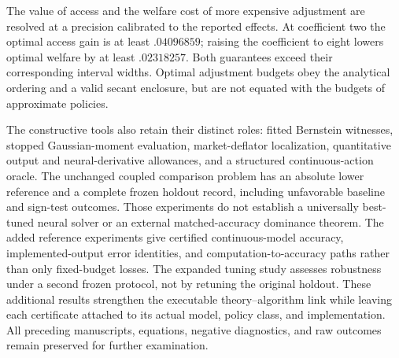 The value of access and the welfare cost of more expensive adjustment are resolved at a precision calibrated to the reported effects. At coefficient two the optimal access gain is at least $.04096859$; raising the coefficient to eight lowers optimal welfare by at least $.02318257$. Both guarantees exceed their corresponding interval widths. Optimal adjustment budgets obey the analytical ordering and a valid secant enclosure, but are not equated with the budgets of approximate policies.

The constructive tools also retain their distinct roles: fitted Bernstein witnesses, stopped Gaussian-moment evaluation, market-deflator localization, quantitative output and neural-derivative allowances, and a structured continuous-action oracle. The unchanged coupled comparison problem has an absolute lower reference and a complete frozen holdout record, including unfavorable baseline and sign-test outcomes. Those experiments do not establish a universally best-tuned neural solver or an external matched-accuracy dominance theorem. The added reference experiments give certified continuous-model accuracy, implemented-output error identities, and computation-to-accuracy paths rather than only fixed-budget losses. The expanded tuning study assesses robustness under a second frozen protocol, not by retuning the original holdout. These additional results strengthen the executable theory--algorithm link while leaving each certificate attached to its actual model, policy class, and implementation. All preceding manuscripts, equations, negative diagnostics, and raw outcomes remain preserved for further examination.
